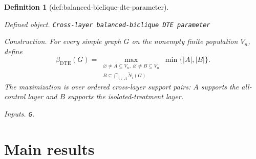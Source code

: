\documentclass{article}
\newtheorem{definition}{Definition}
\begin{document}
\begin{definition}[def:balanced-biclique-dte-parameter]\label{def:balanced-biclique-dte-parameter}
\par\smallskip\noindent\emph{Defined object.} \texttt{Cross-\allowbreak{}layer balanced-\allowbreak{}biclique DTE parameter}
\par\smallskip\noindent\emph{Construction.} For every simple graph \(G\) on the nonempty finite population \(V_n\), define
\[
\beta_{\mathrm{DTE}}(G)
=
\max_{\substack{\varnothing\ne A\subseteq V_n,\ \varnothing\ne B\subseteq V_n\\
B\subseteq\bigcap_{i\in A}\widetilde N_i(G)}}
\min\{|A|,|B|\}.
\]
The maximization is over ordered cross-layer support pairs: \(A\) supports the all-control layer and \(B\) supports the isolated-treatment layer.
\par\smallskip\noindent\emph{Inputs.} \texttt{G}.
\end{definition}

\section{Main results}
\end{document}
